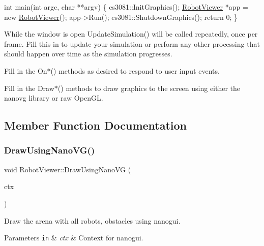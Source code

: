 \begin{DoxyCode}
\textcolor{keywordtype}{int} main(\textcolor{keywordtype}{int} argc, \textcolor{keywordtype}{char} **argv) \{
    cs3081::InitGraphics();
    \hyperlink{classRobotViewer}{RobotViewer} *app = \textcolor{keyword}{new} \hyperlink{classRobotViewer}{RobotViewer}();
    app->Run();
    cs3081::ShutdownGraphics();
    \textcolor{keywordflow}{return} 0;
\}
\end{DoxyCode}


While the window is open Update\+Simulation() will be called repeatedly, once per frame. Fill this in to update your simulation or perform any other processing that should happen over time as the simulation progresses.

Fill in the On$\ast$() methods as desired to respond to user input events.

Fill in the Draw$\ast$() methods to draw graphics to the screen using either the nanovg library or raw Open\+GL. 

\subsection{Member Function Documentation}
\mbox{\label{classRobotViewer_ac67e2c6bc6f4ddc6c50d4c7e05d99662}} 
\subsubsection{\texorpdfstring{Draw\+Using\+Nano\+V\+G()}{DrawUsingNanoVG()}}
{\footnotesize\ttfamily void Robot\+Viewer\+::\+Draw\+Using\+Nano\+VG (\begin{DoxyParamCaption}\item[{N\+V\+Gcontext $\ast$}]{ctx }\end{DoxyParamCaption})\hspace{0.3cm}{\ttfamily [override]}}



Draw the arena with all robots, obstacles using nanogui. 


\begin{DoxyParams}[1]{Parameters}
\mbox{\tt in}  & {\em ctx} & Context for nanogui. \\
\hline
\end{DoxyParams}
\mbox{\label{classRobotViewer_a5a5e4be05ae7a8b3d137a3388638ad63}} 
